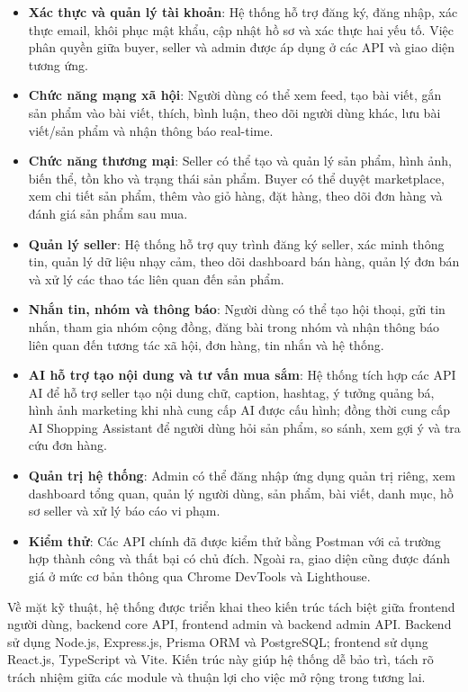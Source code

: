 \begin{itemize}
    \item \textbf{Xác thực và quản lý tài khoản}: Hệ thống hỗ trợ đăng ký, đăng nhập, xác thực email, khôi phục mật khẩu, cập nhật hồ sơ và xác thực hai yếu tố. Việc phân quyền giữa buyer, seller và admin được áp dụng ở các API và giao diện tương ứng.
    \item \textbf{Chức năng mạng xã hội}: Người dùng có thể xem feed, tạo bài viết, gắn sản phẩm vào bài viết, thích, bình luận, theo dõi người dùng khác, lưu bài viết/sản phẩm và nhận thông báo real-time.
    \item \textbf{Chức năng thương mại}: Seller có thể tạo và quản lý sản phẩm, hình ảnh, biến thể, tồn kho và trạng thái sản phẩm. Buyer có thể duyệt marketplace, xem chi tiết sản phẩm, thêm vào giỏ hàng, đặt hàng, theo dõi đơn hàng và đánh giá sản phẩm sau mua.
    \item \textbf{Quản lý seller}: Hệ thống hỗ trợ quy trình đăng ký seller, xác minh thông tin, quản lý dữ liệu nhạy cảm, theo dõi dashboard bán hàng, quản lý đơn bán và xử lý các thao tác liên quan đến sản phẩm.
    \item \textbf{Nhắn tin, nhóm và thông báo}: Người dùng có thể tạo hội thoại, gửi tin nhắn, tham gia nhóm cộng đồng, đăng bài trong nhóm và nhận thông báo liên quan đến tương tác xã hội, đơn hàng, tin nhắn và hệ thống.
    \item \textbf{AI hỗ trợ tạo nội dung và tư vấn mua sắm}: Hệ thống tích hợp các API AI để hỗ trợ seller tạo nội dung chữ, caption, hashtag, ý tưởng quảng bá, hình ảnh marketing khi nhà cung cấp AI được cấu hình; đồng thời cung cấp AI Shopping Assistant để người dùng hỏi sản phẩm, so sánh, xem gợi ý và tra cứu đơn hàng.
    \item \textbf{Quản trị hệ thống}: Admin có thể đăng nhập ứng dụng quản trị riêng, xem dashboard tổng quan, quản lý người dùng, sản phẩm, bài viết, danh mục, hồ sơ seller và xử lý báo cáo vi phạm.
    \item \textbf{Kiểm thử}: Các API chính đã được kiểm thử bằng Postman với cả trường hợp thành công và thất bại có chủ đích. Ngoài ra, giao diện cũng được đánh giá ở mức cơ bản thông qua Chrome DevTools và Lighthouse.
\end{itemize}

Về mặt kỹ thuật, hệ thống được triển khai theo kiến trúc tách biệt giữa frontend người dùng, backend core API, frontend admin và backend admin API. Backend sử dụng Node.js, Express.js, Prisma ORM và PostgreSQL; frontend sử dụng React.js, TypeScript và Vite. Kiến trúc này giúp hệ thống dễ bảo trì, tách rõ trách nhiệm giữa các module và thuận lợi cho việc mở rộng trong tương lai.

